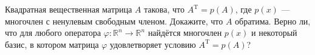 \documentclass{article}
\begin{document}
Квадратная вещественная матрица $A$ такова, что $A^\text{T} = p(A)$, где $p(x)$ --- многочлен с ненулевым свободным членом.
Докажите, что $A$ обратима. Верно ли, что для любого оператора $\varphi : \mathbb{R}^n \to \mathbb{R}^n$ найдётся многочлен 
$p(x)$ и некоторый базис, в котором матрица $\varphi$ удовлетворяет условию $A^\text{T} = p(A)$?
\end{document}

